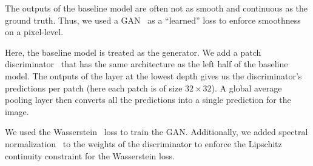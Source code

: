 The outputs of the baseline model are often not as smooth and continuous as the ground truth.
Thus, we used a GAN~\cite{gan} as a ``learned'' loss to enforce smoothness on a pixel-level.

Here, the baseline model is treated as the generator.
We add a patch discriminator~\cite{pix2pix} that has the same architecture as the left half of the baseline model.
The outputs of the layer at the lowest depth gives us the discriminator's predictions per patch (here each patch is of size $32 \times 32$).
A global average pooling layer then converts all the predictions into a single prediction for the image.

We used the Wasserstein~\cite{wgan} loss to train the GAN.
Additionally, we added spectral normalization~\cite{spectral-norm} to the weights of the discriminator to enforce the Lipschitz continuity constraint for the Wasserstein loss.